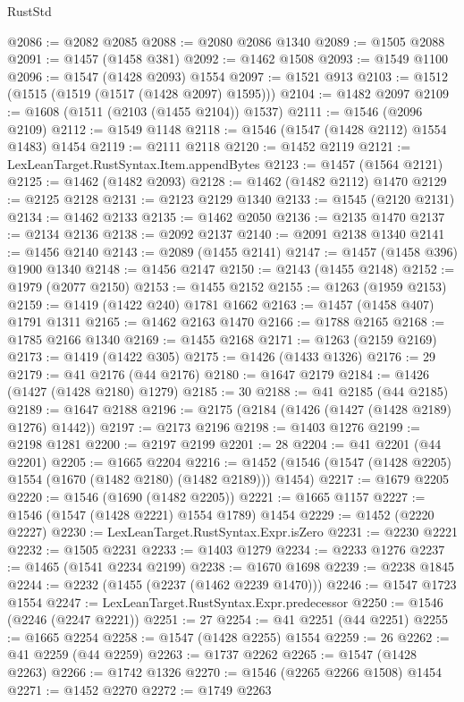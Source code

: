\begin{lexlean}{RustStd}
\begin{coremodule}
{\begin{coremodule}
{{{{{{{{{{{{{{{{{{{{{{{{{{{{{{@2086 := @2082 @2085
@2088 := @2080 @2086 @1340
@2089 := @1505 @2088
@2091 := @1457 (@1458 @381)
@2092 := @1462 @1508
@2093 := @1549 @1100
@2096 := @1547 (@1428 @2093) @1554
@2097 := @1521 @913
@2103 := @1512 (@1515 (@1519 (@1517 (@1428 @2097) @1595)))
@2104 := @1482 @2097
@2109 := @1608 (@1511 (@2103 (@1455 @2104)) @1537)
@2111 := @1546 (@2096 @2109)
@2112 := @1549 @1148
@2118 := @1546 (@1547 (@1428 @2112) @1554 @1483) @1454
@2119 := @2111 @2118
@2120 := @1452 @2119
@2121 := LexLeanTarget.RustSyntax.Item.appendBytes
@2123 := @1457 (@1564 @2121)
@2125 := @1462 (@1482 @2093)
@2128 := @1462 (@1482 @2112) @1470
@2129 := @2125 @2128
@2131 := @2123 @2129 @1340
@2133 := @1545 (@2120 @2131)
@2134 := @1462 @2133
@2135 := @1462 @2050
@2136 := @2135 @1470
@2137 := @2134 @2136
@2138 := @2092 @2137
@2140 := @2091 @2138 @1340
@2141 := @1456 @2140
@2143 := @2089 (@1455 @2141)
@2147 := @1457 (@1458 @396) @1900 @1340
@2148 := @1456 @2147
@2150 := @2143 (@1455 @2148)
@2152 := @1979 (@2077 @2150)
@2153 := @1455 @2152
@2155 := @1263 (@1959 @2153)
@2159 := @1419 (@1422 @240) @1781 @1662
@2163 := @1457 (@1458 @407) @1791 @1311
@2165 := @1462 @2163 @1470
@2166 := @1788 @2165
@2168 := @1785 @2166 @1340
@2169 := @1455 @2168
@2171 := @1263 (@2159 @2169)
@2173 := @1419 (@1422 @305)
@2175 := @1426 (@1433 @1326)
@2176 := 29
@2179 := @41 @2176 (@44 @2176)
@2180 := @1647 @2179
@2184 := @1426 (@1427 (@1428 @2180) @1279)
@2185 := 30
@2188 := @41 @2185 (@44 @2185)
@2189 := @1647 @2188
@2196 := @2175 (@2184 (@1426 (@1427 (@1428 @2189) @1276) @1442))
@2197 := @2173 @2196
@2198 := @1403 @1276
@2199 := @2198 @1281
@2200 := @2197 @2199
@2201 := 28
@2204 := @41 @2201 (@44 @2201)
@2205 := @1665 @2204
@2216 := @1452 (@1546 (@1547 (@1428 @2205) @1554 (@1670 (@1482 @2180) (@1482 @2189))) @1454)
@2217 := @1679 @2205
@2220 := @1546 (@1690 (@1482 @2205))
@2221 := @1665 @1157
@2227 := @1546 (@1547 (@1428 @2221) @1554 @1789) @1454
@2229 := @1452 (@2220 @2227)
@2230 := LexLeanTarget.RustSyntax.Expr.isZero
@2231 := @2230 @2221
@2232 := @1505 @2231
@2233 := @1403 @1279
@2234 := @2233 @1276
@2237 := @1465 (@1541 @2234 @2199)
@2238 := @1670 @1698
@2239 := @2238 @1845
@2244 := @2232 (@1455 (@2237 (@1462 @2239 @1470)))
@2246 := @1547 @1723 @1554
@2247 := LexLeanTarget.RustSyntax.Expr.predecessor
@2250 := @1546 (@2246 (@2247 @2221))
@2251 := 27
@2254 := @41 @2251 (@44 @2251)
@2255 := @1665 @2254
@2258 := @1547 (@1428 @2255) @1554
@2259 := 26
@2262 := @41 @2259 (@44 @2259)
@2263 := @1737 @2262
@2265 := @1547 (@1428 @2263)
@2266 := @1742 @1326
@2270 := @1546 (@2265 @2266 @1508) @1454
@2271 := @1452 @2270
@2272 := @1749 @2263
}}}}}}}}}}}}}}}}}}}}}}}}}}}}}}
\end{coremodule}}
\end{coremodule}
\end{lexlean}
